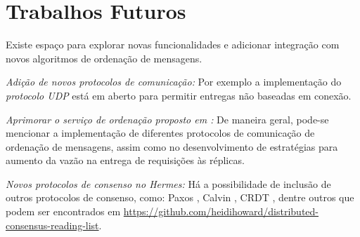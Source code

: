 \section{Trabalhos Futuros}

Existe espaço para explorar novas funcionalidades e adicionar integração com novos algoritmos de ordenação de mensagens.


\textit{Adição de novos protocolos de comunicação:} Por exemplo a implementação do \textit{protocolo \gls{UDP}} está em aberto para permitir entregas não baseadas em conexão. 

\textit{Aprimorar o serviço de ordenação proposto em \textcite{renan2021hermes}:} De maneira geral, pode-se mencionar a implementação de diferentes protocolos de comunicação de ordenação de mensagens, assim como no desenvolvimento de estratégias para aumento da vazão na entrega de requisições às réplicas.



\textit{Novos protocolos de consenso no Hermes:} Há a possibilidade de inclusão de outros protocolos de consenso, como: Paxos \cite{lamport1998part}, Calvin \cite{calvin-10.1145/2213836.2213838}, CRDT \cite{demers1987epidemic}, dentre outros que podem ser encontrados em \url{https://github.com/heidihoward/distributed-consensus-reading-list}.

